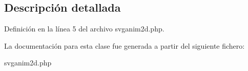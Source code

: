 \subsection{\-Descripción detallada}


\-Definición en la línea 5 del archivo svganim2d.\-php.



\-La documentación para esta clase fue generada a partir del siguiente fichero\-:\begin{DoxyCompactItemize}
\item 
svganim2d.\-php\end{DoxyCompactItemize}
